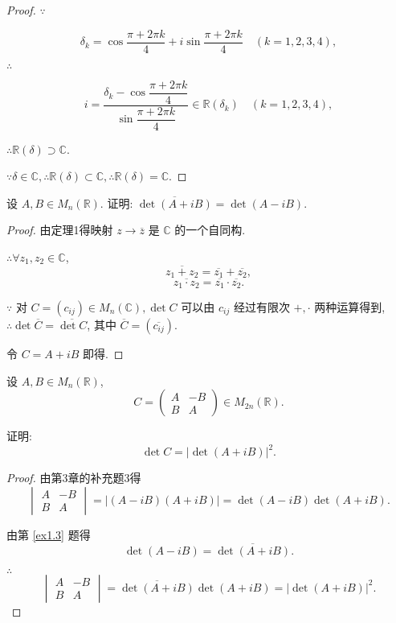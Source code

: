 \documentclass[UTF8]{ctexart}
\begin{document}
\begin{proof}
    $\because$

    \[\delta_k=\cos\dfrac{\pi+2\pi k}{4}+i\sin\dfrac{\pi+2\pi k}{4}\quad(k=1,2,3,4),\]

    $\therefore$

    \[i=\dfrac{\delta_k-\cos\dfrac{\pi+2\pi k}{4}}{\sin\dfrac{\pi+2\pi k}{4}}\in\mathbb{R}(\delta_k)\quad(k=1,2,3,4),\]

    $\therefore\mathbb{R}(\delta)\supset\mathbb{C}$.

    $\because\delta\in\mathbb{C},\therefore\mathbb{R}(\delta)\subset\mathbb{C},\therefore\mathbb{R}(\delta)=\mathbb{C}$.
\end{proof}
\begin{exercise}[1.3]\label{ex1.3}
    设 $A,B\in M_n(\mathbb{R})$. 证明: $\overline{\det(A+iB)}=\det(A-iB)$.
\end{exercise}
\begin{proof}
    由定理1得映射 $z\to\overline{z}$ 是 $\mathbb{C}$ 的一个自同构.

    $\therefore\forall z_1,z_2\in\mathbb{C}$,
    \[\overline{z_1+z_2}=\overline{z_1}+\overline{z_2},\]
    \[\overline{z_1\cdot z_2}=\overline{z_1}\cdot\overline{z_2}.\]

    $\because$ 对 $C=(c_{ij})\in M_n(\mathbb{C}),\det C$ 可以由 $c_{ij}$ 经过有限次 $+,\cdot$ 两种运算得到, $\therefore\det\overline{C}=\overline{\det C}$, 其中 $\overline{C}=(\overline{c_{ij}})$.

    令 $C=A+iB$ 即得.
\end{proof}
\begin{exercise}[1.4]\label{ex1.4}
    设 $A,B\in M_n(\mathbb{R})$,
    \[C=\begin{pmatrix}
        A & -B \\
        B & A
    \end{pmatrix}\in M_{2n}(\mathbb{R}).\]

    证明:
    \[\det C=|\det(A+iB)|^2.\]
\end{exercise}
\begin{proof}
    由第3章的补充题3得
    \[\begin{vmatrix}
        A & -B \\
        B & A
    \end{vmatrix}=|(A-iB)(A+iB)|=\det(A-iB)\det(A+iB).\]

    由第 \ref{ex1.3} 题得
    \[\det(A-iB)=\overline{\det(A+iB)}.\]

    $\therefore$
    \[\begin{vmatrix}
        A & -B \\
        B & A
    \end{vmatrix}=\overline{\det(A+iB)}\det(A+iB)=|\det(A+iB)|^2.\]
\end{proof}
\end{document}
